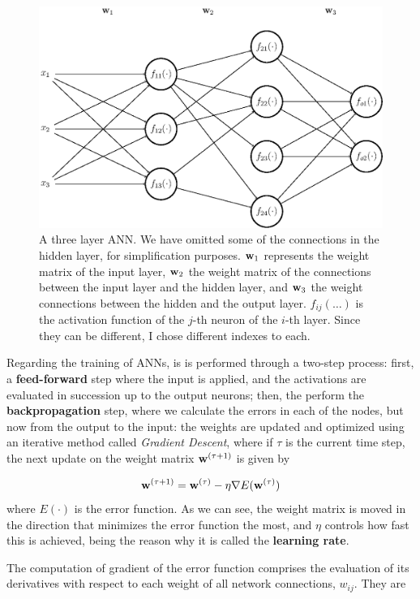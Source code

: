 \begin{figure}[H]
	\centering
	\includegraphics[width=0.9\linewidth]{figures/ann.eps}
	\caption{A three layer ANN. We have omitted some of the connections in the hidden layer, for simplification purposes. $\mathbf{w}_1$ represents the weight matrix of the input layer, $\mathbf{w}_2$ the weight matrix of the connections between the input layer and the hidden layer, and $\mathbf{w}_3$ the weight connections between the hidden and the output layer. $f_{ij}(\dots)$ is the activation function of the $j$-th neuron of the $i$-th layer. Since they can be different, I chose different indexes to each.}
	\label{fig:neuralnet}
\end{figure}

Regarding the training of ANNs, is is performed through a two-step process: first, a \textbf{feed-forward} step where the input is applied, and the activations are evaluated in succession up to the output neurons; then, the perform the \textbf{backpropagation} step, where we calculate the errors in each of the nodes, but now from the output to the input: the weights are updated and optimized using an iterative  method called \textit{Gradient Descent}, where if $\tau$ is the current time step, the next update on the weight matrix $\mathbf{w}^{(\tau+1)}$ is given by

\begin{equation}\label{eq:gradDesc}
	\mathbf{w}^{(\tau+1)} = \mathbf{w}^{(\tau)} - \eta \nabla E(\mathbf{w}^{(\tau)})
\end{equation}
where $E(\cdot)$ is the error function. As we can see, the weight matrix is moved in the direction that minimizes the error function the most, and $\eta$ controls how fast this is achieved, being the reason why it is called the \textbf{learning rate}.

The computation of gradient of the error function comprises the evaluation of its derivatives with respect to each weight of all network connections, $w_{ij}$. They are

